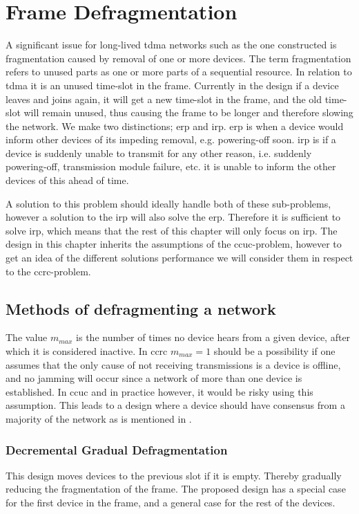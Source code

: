 \section{Frame Defragmentation}
A significant issue for long-lived \gls{tdma} networks such as the one constructed is fragmentation caused by removal of one or more devices. 
The term fragmentation refers to unused parts as one or more parts of a sequential resource. 
In relation to \gls{tdma} it is an unused time-slot in the frame. 
Currently in the design if a device leaves and joins again, it will get a new time-slot in the frame, and the old time-slot will remain unused, thus causing the frame to be longer and therefore slowing the network.
We make two distinctions; \gls{erp} and \gls{irp}.
\gls{erp} is when a device would inform other devices of its impeding removal, e.g. powering-off soon. 
\gls{irp} is if a device is suddenly unable to transmit for any other reason, i.e. suddenly powering-off, transmission module failure, etc. it is unable to inform the other devices of this ahead of time. 

A solution to this problem should ideally handle both of these sub-problems, however a solution to the \gls{irp} will also solve the \gls{erp}.
Therefore it is sufficient to solve \gls{irp}, which means that the rest of this chapter will only focus on \gls{irp}.  
The design in this chapter inherits the assumptions of the \gls{ccuc}-problem, however to get an idea of the different solutions performance we will consider them in respect to the \gls{ccrc}-problem. 

\subsection{Methods of defragmenting a network}

The value $m_{max}$ is the number of times no device hears from a given device, after which it is considered inactive. 
In \gls{ccrc} $m_{max} = 1$ should be a possibility if one assumes that the only cause of not receiving transmissions is a device is offline, and no jamming will occur since a network of more than one device is established.
In \gls{ccuc} and in practice however, it would be risky using this assumption.
This leads to a design where a device should have consensus from a majority of the network as is mentioned in .

\subsubsection{Decremental Gradual Defragmentation}
This design moves devices to the previous slot if it is empty. 
Thereby gradually reducing the fragmentation of the frame.
The proposed design has a special case for the first device in the frame, and a general case for the rest of the devices.

